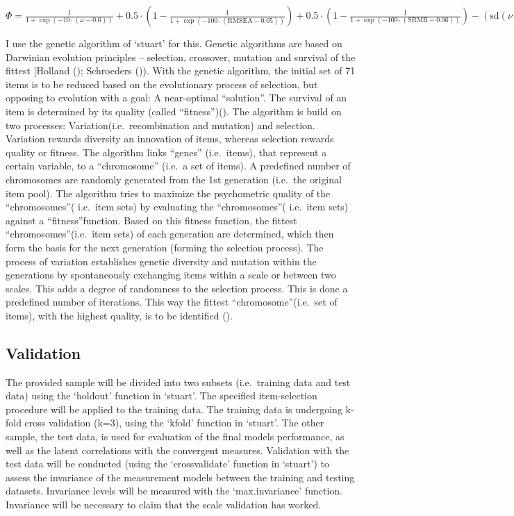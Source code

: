 \documentclass[
  12pt,
  a4paper,
  twoside]{article}
\begin{document}
\begin{center}
$\Phi = \frac{1}{1 + \exp(-10 \cdot (\omega - 0.6))} + 0.5 \cdot \left(1 - \frac{1}{1 + \exp(-100 \cdot (\textrm{RMSEA} - 0.05))}\right) + 0.5 \cdot \left(1 - \frac{1}{1 + \exp(-100 \cdot (\textrm{SRMR} - 0.06))}\right) - (\textrm{sd}(\nu) - 1.62)^2 + 1.62^2 + 10^{-6}$
\end{center}

I use the genetic algorithm of `stuart' for this. Genetic algorithms are based on Darwinian evolution principles -- selection, crossover, mutation and survival of the fittest {[}Holland (); Schroeders ()). With the genetic algorithm, the initial set of 71 items is to be reduced based on the evolutionary process of selection, but opposing to evolution with a goal: A near-optimal ``solution''. The survival of an item is determined by its quality (called ``fitness'')(). The algorithm is build on two processes: Variation(i.e.~recombination and mutation) and selection. Variation rewards diversity an innovation of items, whereas selection rewards quality or fitness. The algorithm links ``genes'' (i.e.~items), that represent a certain variable, to a ``chromosome'' (i.e.~a set of items). A predefined number of chromosomes are randomly generated from the 1st generation (i.e.~the original item pool). The algorithm tries to maximize the psychometric quality of the ``chromosomes''( i.e.~item sets) by evaluating the ``chromosomes''( i.e.~item sets) against a ``fitness''function. Based on this fitness function, the fittest ``chromosomes''(i.e.~item sets) of each generation are determined, which then form the basis for the next generation (forming the selection process). The process of variation establishes genetic diversity and mutation within the generations by spontaneously exchanging items within a scale or between two scales. This adds a degree of randomness to the selection process. This is done a predefined number of iterations. This way the fittest ``chromosome''(i.e.~set of items), with the highest quality, is to be identified ().

\subsection{Validation}\label{validation}

The provided sample will be divided into two subsets (i.e.~training data and test data) using the `holdout' function in `stuart'. The specified item-selection procedure will be applied to the training data. The training data is undergoing k-fold cross validation (k=3), using the `kfold' function in `stuart'. The other sample, the test data, is used for evaluation of the final models performance, as well as the latent correlations with the convergent measures.
Validation with the test data will be conducted (using the `crossvalidate' function in `stuart') to assess the invariance of the measurement models between the training and testing datasets. Invariance levels will be measured with the `max.invariance' function. Invariance will be necessary to claim that the scale validation has worked.
\end{document}
